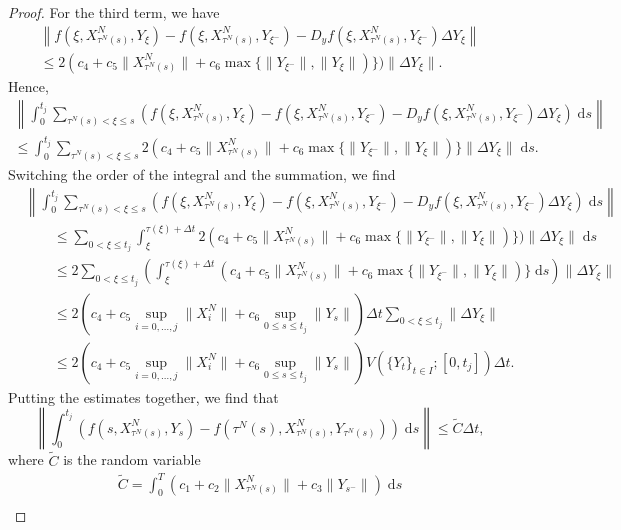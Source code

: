 \documentclass[reqno,12pt]{amsart}
\theoremstyle{plain} %
\theoremstyle{definition} %
\begin{document}
\begin{proof}
    For the third term, we have
    \begin{multline*}
        \left\|f(\xi, X_{\tau^N(s)}^N, Y_\xi) - f(\xi, X_{\tau^N(s)}^N, Y_{\xi^{-}}) - D_y f(\xi, X_{\tau^N(s)}^N, Y_{\xi^-})\Delta Y_\xi\right\| \\
        \leq 2(c_4 + c_5\|X_{\tau^N(s)}^N\| + c_6\max\{\|Y_{\xi^{-}}\|, \|Y_{\xi}\|)\})\|\Delta Y_\xi\|.
    \end{multline*}
    Hence,
    \begin{multline*}
        \left\|\int_0^{t_j} \sum_{\tau^N(s) < \xi \leq s} \left(f(\xi, X_{\tau^N(s)}^N, Y_\xi) - f(\xi, X_{\tau^N(s)}^N, Y_{\xi^{-}}) - D_y f(\xi, X_{\tau^N(s)}^N, Y_{\xi^-})\Delta Y_\xi\right)\;\mathrm{d}s\right\| \\
        \leq \int_0^{t_j} \sum_{\tau^N(s) < \xi \leq s} 2(c_4 + c_5\|X_{\tau^N(s)}^N\| + c_6\max\{\|Y_{\xi^{-}}\|, \|Y_{\xi}\|)\}\|\Delta Y_\xi\|\;\mathrm{d}s.
    \end{multline*}
    Switching the order of the integral and the summation, we find
    \begin{align*}
        & \left\|\int_0^{t_j} \sum_{\tau^N(s) < \xi \leq s} \left(f(\xi, X_{\tau^N(s)}^N, Y_\xi) - f(\xi, X_{\tau^N(s)}^N, Y_{\xi^{-}}) - D_y f(\xi, X_{\tau^N(s)}^N, Y_{\xi^-})\Delta Y_\xi\right)\;\mathrm{d}s\right\| \\
        & \qquad \leq \sum_{0 < \xi \leq t_j} \int_{\xi}^{\tau(\xi)+\Delta t} 2(c_4 + c_5\|X_{\tau^N(s)}^N\| + c_6\max\{\|Y_{\xi^{-}}\|, \|Y_{\xi}\|)\})\|\Delta Y_\xi\|\;\mathrm{d}s \\
        & \qquad \leq 2 \sum_{0 < \xi \leq t_j} \left(\int_{\xi}^{\tau(\xi)+\Delta t} (c_4 + c_5\|X_{\tau^N(s)}^N\| + c_6\max\{\|Y_{\xi^{-}}\|, \|Y_{\xi}\|)\}\;\mathrm{d}s \right)\|\Delta Y_\xi\| \\
        & \qquad \leq 2\left(c_4 + c_5\sup_{i=0, \ldots, j}\|X_i^N\| + c_6\sup_{0\leq s \leq t_j}\|Y_s\|\right) \Delta t \sum_{0 < \xi \leq t_j} \|\Delta Y_\xi\| \\
        & \qquad \leq 2\left(c_4 + c_5\sup_{i=0, \ldots, j}\|X_i^N\| + c_6\sup_{0\leq s \leq t_j}\|Y_s\|\right) V(\{Y_t\}_{t\in I}; [0, t_j]) \Delta t.
    \end{align*}
    Putting the estimates together, we find that
    \[
        \left\|\int_0^{t_j} \left( f(s, X_{\tau^N(s)}^N, Y_s) - f(\tau^N(s), X_{\tau^N(s)}^N, Y_{\tau^N(s)}) \right)\;\mathrm{d}s\right\| \leq \tilde C \Delta t,
    \]
    where $\tilde C$ is the random variable
    \begin{multline}
        \tilde C = \int_0^T \left(c_1 + c_2 \|X_{\tau^N(s)}^N\| + c_3\|Y_{s^-}\|\right)\;\mathrm{d}s \\

\end{multline}
\end{proof}
\end{document}
